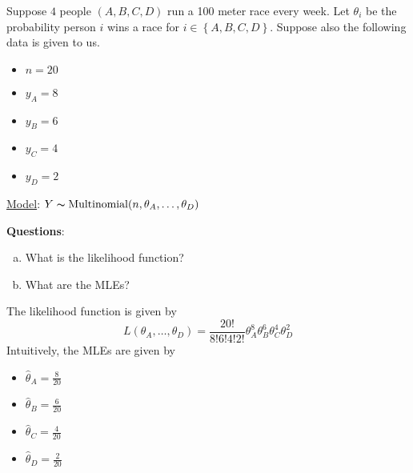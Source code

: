 \begin{exbox}
    \begin{example}
        Suppose $ 4 $ people $ (A,B,C,D) $ run a 100 meter race every week.
        Let $ \theta_i $ be the probability person $ i $ wins a race for $ i\in\left\{ A,B,C,D\right\} $.
        Suppose also the following data is given to us.
        \begin{itemize}
            \item $ n=20 $
            \item $ y_A=8 $
            \item $ y_B=6 $
            \item $ y_C=4 $
            \item $ y_D=2 $
        \end{itemize}
        \underline{Model}: $ Y \thicksim \operatorname{Multinomial}(n,\theta_A,\ldots ,\theta_D) $

        \textbf{Questions}:
        \begin{enumerate}[(a)]
            \item What is the likelihood function?
            \item What are the MLEs?
        \end{enumerate}
        The likelihood function is given by
        \[ L(\theta_A,\ldots ,\theta_D)=\frac{20!}{8!6!4!2!} \theta_A^8\theta_B^6\theta_C^4\theta_D^2 \]
        Intuitively, the MLEs are given by
        \begin{itemize}
            \item $ \hat{\theta}_A=\frac{8}{20} $
            \item $ \hat{\theta}_B=\frac{6}{20} $
            \item $ \hat{\theta}_C=\frac{4}{20} $
            \item $ \hat{\theta}_D=\frac{2}{20} $
        \end{itemize}
    \end{example}
\end{exbox}

